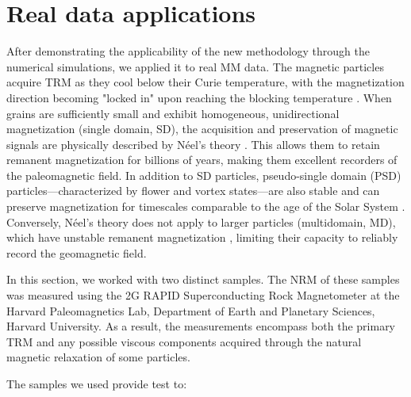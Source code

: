 \section{Real data applications}

After demonstrating the applicability of the new methodology through the numerical simulations, we applied it to real MM data. The magnetic particles \citep[most commonly magnetite,][]{OReilly1984} acquire TRM as they cool below their Curie temperature, with the magnetization direction becoming "locked in" upon reaching the blocking temperature \citep{Dunlop1997}. When grains are sufficiently small and exhibit homogeneous, unidirectional magnetization (single domain, SD), the acquisition and preservation of magnetic signals are physically described by Néel’s theory \citep{Neel1949, Neel1955}. This allows them to retain remanent magnetization for billions of years, making them excellent recorders of the paleomagnetic field. In addition to SD particles, pseudo-single domain (PSD) particles—characterized by flower and vortex states—are also stable and can preserve magnetization for timescales comparable to the age of the Solar System \citep{Nagy2017, Lascu2018,Bellon-2024a}. Conversely, Néel’s theory does not apply to larger particles (multidomain, MD), which have unstable remanent magnetization \citep[e.g., due to viscous domain reorganization,][]{DeGroot2014}, limiting their capacity to reliably record the geomagnetic field. 

In this section, we worked with two distinct samples. The NRM of these samples was measured using the 2G RAPID Superconducting Rock Magnetometer at the Harvard Paleomagnetics Lab, Department of Earth and Planetary Sciences, Harvard University. As a result, the measurements encompass both the primary TRM and any possible viscous components acquired through the natural magnetic relaxation of some particles. 

The samples we used provide test to:

